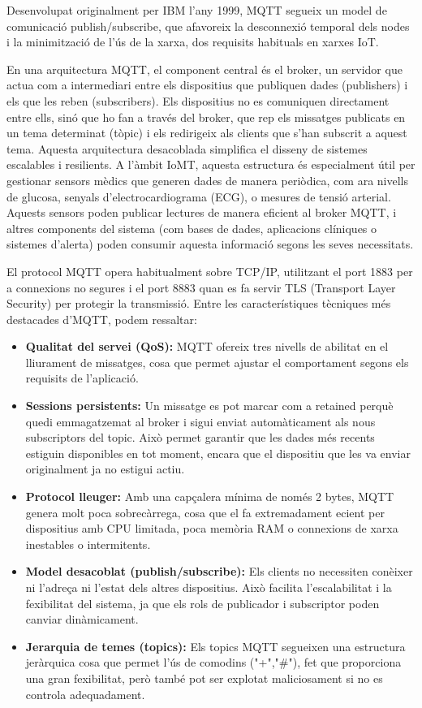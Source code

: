   Desenvolupat originalment per IBM l’any 1999, MQTT segueix un model de comunicació publish/subscribe, que afavoreix la desconnexió temporal dels nodes i la minimització de l’ús de la xarxa, dos requisits habituals en xarxes IoT. 
  
  En una arquitectura MQTT, el component central és el broker, un servidor que actua com a intermediari entre els dispositius que publiquen dades (publishers) i els que les reben (subscribers). Els dispositius no es comuniquen directament entre ells, sinó que ho fan a través del broker, que rep els missatges publicats en un tema determinat (tòpic) i els redirigeix als clients que s’han subscrit a aquest tema. Aquesta arquitectura desacoblada simplifica el disseny de sistemes escalables i resilients. A l’àmbit IoMT, aquesta estructura és especialment útil per gestionar sensors mèdics que generen dades de manera periòdica, com ara nivells de glucosa, senyals d’electrocardiograma (ECG), o mesures de tensió arterial. Aquests sensors poden publicar lectures de manera eficient al broker MQTT, i altres components del sistema (com bases de dades, aplicacions clíniques o sistemes d’alerta) poden consumir aquesta informació segons les seves necessitats. 
  
  El protocol MQTT opera habitualment sobre TCP/IP, utilitzant el port 1883 per a connexions no segures i el port 8883 quan es fa servir TLS (Transport Layer Security) per protegir la transmissió. Entre les característiques tècniques més destacades d’MQTT, podem ressaltar:
  
  \begin{itemize}
      \item \textbf{Qualitat del servei (QoS):} MQTT ofereix tres nivells de abilitat en el lliurament de missatges, cosa que permet ajustar el comportament segons els requisits de l’aplicació. 
      \item \textbf{Sessions persistents:} Un missatge es pot marcar com a retained perquè quedi emmagatzemat al broker i sigui enviat automàticament als nous subscriptors del topic. Això permet garantir que les dades més recents estiguin disponibles en tot moment, encara que el dispositiu que les va enviar originalment ja no estigui actiu. 
      \item \textbf{Protocol lleuger:} Amb una capçalera mínima de només 2 bytes, MQTT genera molt poca sobrecàrrega, cosa que el fa extremadament ecient per dispositius amb CPU limitada, poca memòria RAM o connexions de xarxa inestables o intermitents.
      \item \textbf{Model desacoblat (publish/subscribe):} Els clients no necessiten conèixer ni l’adreça ni l’estat dels altres dispositius. Això facilita l’escalabilitat i la fexibilitat del sistema, ja que els rols de publicador i subscriptor poden canviar dinàmicament. 
      \item \textbf{Jerarquia de temes (topics):} Els topics MQTT segueixen una estructura jeràrquica cosa que permet l’ús de comodins ("+","\#"), fet que proporciona una gran fexibilitat, però també pot ser explotat maliciosament si no es controla adequadament. 
  \end{itemize}

